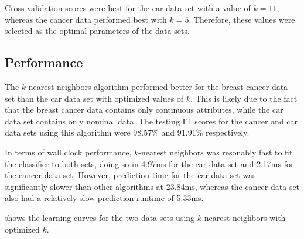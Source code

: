 \documentclass{article}
\begin{document}
    Cross-validation scores were best for the car data set with a value of $k=11$, whereas the cancer data performed best with $k=5$. Therefore, these values were selected as the optimal parameters of the data sets.

    \subsection{Performance}
    The $k$-nearest neighbors algorithm performed better for the breast cancer data set than the car data set with optimized values of $k$. This is likely due to the fact that the breast cancer data contains only continuous attributes, while the car data set contains only nominal data. The testing F1 scores for the cancer and car data sets using this algorithm were 98.57\% and 91.91\% respectively.

    In terms of wall clock performance, $k$-nearest neighbors was resonably fast to fit the classifier to both sets, doing so in 4.97ms for the car data set and 2.17ms for the cancer data set. However, prediction time for the car data set was significantly slower than other algorithms at 23.84ms, whereas the cancer data set also had a relatively slow prediction runtime of 5.33ms.

     shows the learning curves for the two data sets using $k$-nearest neighbors with optimized $k$.
\end{document}
